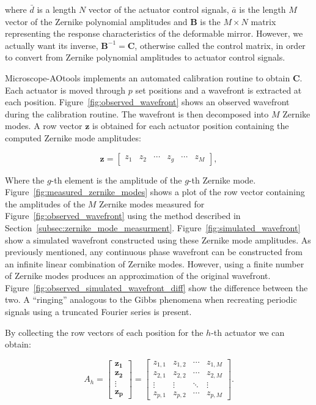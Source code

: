 where $\bar{d}$ is a length $N$ vector of the actuator control signals, 
$\bar{a}$ is the length $M$ vector of the Zernike polynomial amplitudes and 
$\boldsymbol{B}$ is the $M \times N$ matrix representing the response 
characteristics of the deformable mirror. However, we actually want its 
inverse, $\boldsymbol{B}^{-1} =\boldsymbol{C}$, otherwise called the control 
matrix, in order to convert from Zernike polynomial amplitudes to actuator 
control signals.

Microscope-AOtools implements an automated calibration routine to obtain 
$\boldsymbol{C}$. Each actuator is moved through $p$ set positions and a 
wavefront is extracted at each position. Figure~\ref{fig:observed_wavefront} 
shows an observed wavefront during the calibration routine. The wavefront is 
then decomposed into $M$ Zernike modes\cite{townson2019aotools}. A row vector 
$\boldsymbol{z}$ is obtained for each actuator position containing the 
computed Zernike mode amplitudes:

\begin{equation}\label{eq:zernike_amp}
\boldsymbol{z} = 
\begin{bmatrix}
z_{1} & z_{2} & \cdots & z_{g} & \cdots & z_{M}
\end{bmatrix},
\end{equation}

Where the $g$-th element is the amplitude of the $g$-th
Zernike mode. Figure~\ref{fig:measured_zernike_modes} shows
a plot of the row vector containing the amplitudes of the 
$M$ Zernike modes measured for Figure~\ref{fig:observed_wavefront} using the 
method described in Section~\ref{subsec:zernike_mode_measurment}.
Figure~\ref{fig:simulated_wavefront} show a simulated wavefront 
constructed using these Zernike mode amplitudes. As previously 
mentioned, any continuous phase wavefront can be constructed from an 
infinite linear combination of Zernike modes\cite{noll1976zernike}. 
However, using a finite number of Zernike modes produces an 
approximation of the original wavefront. 
Figure~\ref{fig:observed_simulated_wavefront_diff} show the
difference between the two. A ``ringing'' analogous to the 
Gibbs phenomena when recreating periodic signals using a
truncated Fourier series is present\cite{weisstein2003gibbs}.

By collecting the row vectors of each position
for the $h$-th actuator we can obtain:

\begin{equation}\label{eq:zernike_amp_actuator}
A_h = 
\begin{bmatrix}
\boldsymbol{z_{1}}\\
\boldsymbol{z_{2}}\\
\vdots\\
\boldsymbol{z_{p}} 
\end{bmatrix}
=
\begin{bmatrix}
z_{1,1} & z_{1,2} & \cdots & z_{1,M} \\
z_{2,1} & z_{2,2} & \cdots & z_{2,M} \\
\vdots  & \vdots  & \ddots & \vdots  \\
z_{p,1} & z_{p,2} & \cdots & z_{p,M} 
\end{bmatrix}.
\end{equation}


